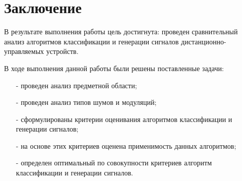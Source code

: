 \chapter*{Заключение}

В результате выполнения работы цель достигнута: проведен сравнительный анализ алгоритмов классификации и генерации сигналов дистанционно-управляемых устройств.

В ходе выполнения данной работы были решены поставленные задачи:
\begin{itemize}
	\item[-] проведен анализ предметной области;
	\item[-] проведен анализ типов шумов и модуляций;
	\item[-] сформулированы критерии оценивания алгоритмов классификации и генерации сигналов;
	\item[-] на основе этих критериев оценена применимость данных алгоритмов;
	\item[-] определен оптимальный по совокупности критериев алгоритм классификации и генерации сигналов.
\end{itemize}